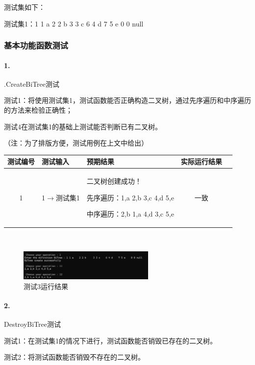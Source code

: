 \documentclass[supercite]{Experimental_Report}
\theoremstyle{definition}
\begin{document}
测试集如下：

测试集1：1 1 a  2 2 b  3 3 c  6 4 d  7 5 e  0 0 null

\setcounter{paragraph}{0}

\subsubsection{基本功能函数测试}

\paragraph{ 1.}.CreateBiTree测试

测试1：将使用测试集1，测试函数能否正确构造二叉树，通过先序遍历和中序遍历的方法来检验正确性；

测试4在测试集1的基础上测试能否判断已有二叉树。

（注：为了排版方便，测试用例在上文中给出）

\vspace{0.5em}

\begin{tabular}{|c|l|p{6cm}|c|c|}
	\hline
	测试编号 & 测试输入 & 预期结果 & 实际运行结果 \\
	\hline
	1 & 1$\rightarrow$测试集1 & 二叉树创建成功！

先序遍历：1,a 2,b 3,c 4,d 5,e

中序遍历：2,b 1,a 4,d 3,c 5,e & 一致 \\
	\hline
\end{tabular}

~\

 \begin{figure}[H]
 	\centering
 	\includegraphics[width=0.6\textwidth]{images/二叉树测试1.png}
 	\caption{测试3运行结果}
 	\label{txlab}
 \end{figure}

\paragraph{ 2.}DestroyBiTree测试

测试1：在测试集1的情况下进行，测试函数能否销毁已存在的二叉树。

测试2：将测试函数能否销毁不存在的二叉树。

\vspace{0.5em}
\end{document}
